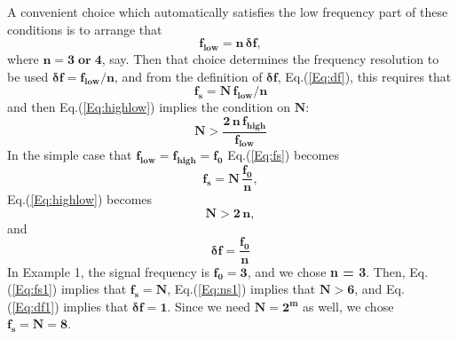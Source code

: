 \documentclass[11pt]{article}
\begin{document}
A convenient choice which automatically satisfies the low frequency part of these
  conditions is to arrange that
\begin{equation}  \label{Eq:flow}
  \mathbf{f_{low} = n\,\boldsymbol{\delta}f},
\end{equation}
  where $\mathbf{n = 3 \;\text{or} \; 4}$, say.
Then that choice determines the frequency resolution to be used 
 $\mathbf{\boldsymbol{\delta}f = f_{low}/n}$, and from the definition
 of $\mathbf{\boldsymbol{\delta}f}$, Eq.(\ref{Eq:df}),  this requires that
\begin{equation} \label{Eq:fs}
\mathbf{f_{s} = N\,f_{low}/n }
\end{equation}
and then Eq.(\ref{Eq:highlow}) implies the condition on $\mathbf{N}$:
\begin{equation} \label{Eq:nmin}
\mathbf{N > \frac{2\,n\,f_{high}}{f_{low}}}
\end{equation}
In the simple case that $\mathbf{f_{low} = f_{high} = f_{0}}$
  Eq.(\ref{Eq:fs}) becomes
\begin{equation} \label{Eq:fs1}
\mathbf{f_{s} =  N \, \frac{f_{0}}{n} },
\end{equation}
Eq.(\ref{Eq:highlow}) becomes
\begin{equation}  \label{Eq:ns1}
\mathbf{N > 2\,n},
\end{equation}
and 
\begin{equation}  \label{Eq:df1}
\mathbf{ \boldsymbol{\delta}f = \frac{f_{0}}{n} }
\end{equation}
In Example 1, the signal frequency is $\mathbf{f_{0} = 3}$, and we chose \textbf{n = 3}.
Then, Eq.(\ref{Eq:fs1}) implies that $\mathbf{f_{s} = N}$, 
  Eq.(\ref{Eq:ns1}) implies that $\mathbf{N > 6}$, and
  Eq.(\ref{Eq:df1}) implies that $\mathbf{\boldsymbol{\delta}f = 1}$.
Since we need $\mathbf{N = 2^{m}}$ as well, we chose $\mathbf{f_{s} = N = 8}$.\\
\end{document}

